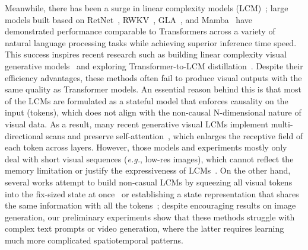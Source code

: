 Meanwhile, there has been a surge in linear complexity models (LCM)~\citep{katharopoulos2020transformers,choromanski2020performers,shen2021efficient,qin2022cosformer,yang2023gated}; large models built based on RetNet~\citep{sun2023retentive}, RWKV~\citep{peng2023rwkv}, GLA~\citep{yang2023gated}, and Mamba~\citep{gu2023mamba,dao2024mamba2} have demonstrated performance comparable to Transformers across a variety of natural language processing tasks while achieving superior inference time speed. This success inspires recent research such as building linear complexity visual generative models~\citep{yan2023difussm,hu2024zigma,fei2024dimba,yang2023gated,zhu2024dig} and exploring Transformer-to-LCM distillation~\citep{wang2024mambainllama,bick2024mohawk,liu2024linfusion}. Despite their efficiency advantages, these methods often fail to produce visual outputs with the same quality as Transformer models. An essential reason behind this is that most of the LCMs are formulated as a stateful model that enforces causality on the input (tokens), which does not align with the non-causal N-dimensional nature of visual data. As a result, many recent generative visual LCMs implement multi-directional scans and preserve self-attention~\citep{gao2024matten,zhang2024motion,fei2024dimba,hu2024zigma,chen2024maskmamba,yi2024mvgamba}, which enlarges the receptive field of each token across layers.
However, those models and experiments mostly only deal with short visual sequences (\textit{e.g.}, low-res images), which cannot reflect the memory limitation or justify the expressiveness of LCMs~\citep{jelassi2024repeat,merrill2024illusion}. On the other hand, several works attempt to build non-casual LCMs by squeezing all visual tokens into the fix-sized state at once~\citep{liu2024linfusion,xie2024sana} or establishing a state representation that shares the same information with all the tokens~\citep{shi2024vssd}; despite encouraging results on image generation, our preliminary experiments show that these methods struggle with complex text prompts or video generation, where the latter requires learning much more complicated spatiotemporal patterns.

